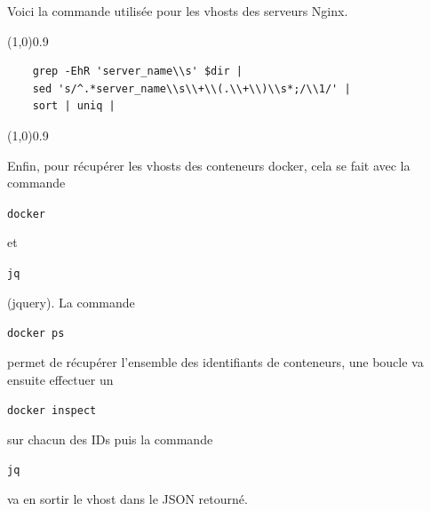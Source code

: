 \documentclass[12pt, a4paper, twoside]{article}
\begin{document}
Voici la commande utilisée pour les vhosts des serveurs Nginx.
\vspace{-1ex}
\begin{code}
\vspace{-1ex}
\begin{center} 
    \line(1,0){0.9\textwidth} 
\end{center}
\vspace{-1ex}
\begin{verbatim}
    grep -EhR 'server_name\\s' $dir | 
    sed 's/^.*server_name\\s\\+\\(.\\+\\)\\s*;/\\1/' |
    sort | uniq |
\end{verbatim}
    \vspace{-1ex}
\begin{center} 
    \line(1,0){0.9\textwidth} 
\end{center}
\end{code}

Enfin, pour récupérer les vhosts des conteneurs docker, cela se fait avec la commande \begin{code}\texttt{docker}\end{code} et \begin{code}\texttt{jq}\end{code} (jquery).
La commande \begin{code}\texttt{docker ps}\end{code} permet de récupérer l'ensemble des identifiants de conteneurs, une boucle va ensuite effectuer un \begin{code} \texttt{docker inspect}\end{code} sur chacun des IDs puis la commande \begin{code} \texttt{jq}\end{code}  va en sortir le vhost dans le \gls{JSON} retourné.
\end{document}
